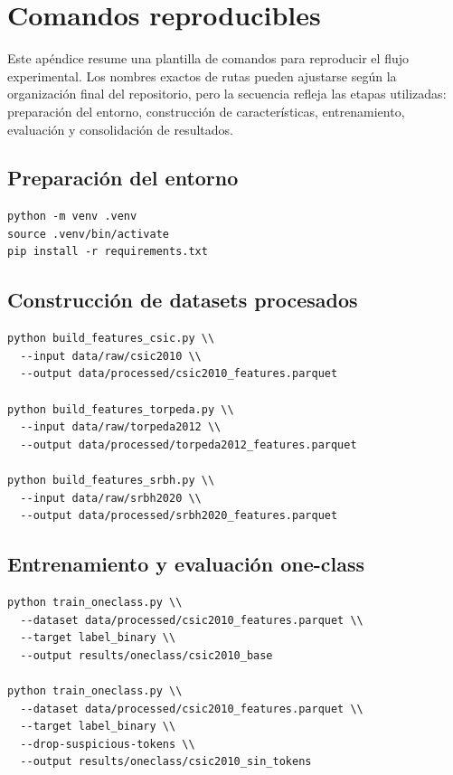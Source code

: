 \documentclass[12pt,oneside]{report}
\begin{document}
\chapter{Comandos reproducibles}

Este apéndice resume una plantilla de comandos para reproducir el flujo experimental. Los nombres exactos de rutas pueden ajustarse según la organización final del repositorio, pero la secuencia refleja las etapas utilizadas: preparación del entorno, construcción de características, entrenamiento, evaluación y consolidación de resultados.

\section*{Preparación del entorno}

\begin{verbatim}
python -m venv .venv
source .venv/bin/activate
pip install -r requirements.txt
\end{verbatim}

\section*{Construcción de datasets procesados}

\begin{verbatim}
python build_features_csic.py \\
  --input data/raw/csic2010 \\
  --output data/processed/csic2010_features.parquet

python build_features_torpeda.py \\
  --input data/raw/torpeda2012 \\
  --output data/processed/torpeda2012_features.parquet

python build_features_srbh.py \\
  --input data/raw/srbh2020 \\
  --output data/processed/srbh2020_features.parquet
\end{verbatim}

\section*{Entrenamiento y evaluación one-class}

\begin{verbatim}
python train_oneclass.py \\
  --dataset data/processed/csic2010_features.parquet \\
  --target label_binary \\
  --output results/oneclass/csic2010_base

python train_oneclass.py \\
  --dataset data/processed/csic2010_features.parquet \\
  --target label_binary \\
  --drop-suspicious-tokens \\
  --output results/oneclass/csic2010_sin_tokens
\end{verbatim}
\end{document}

